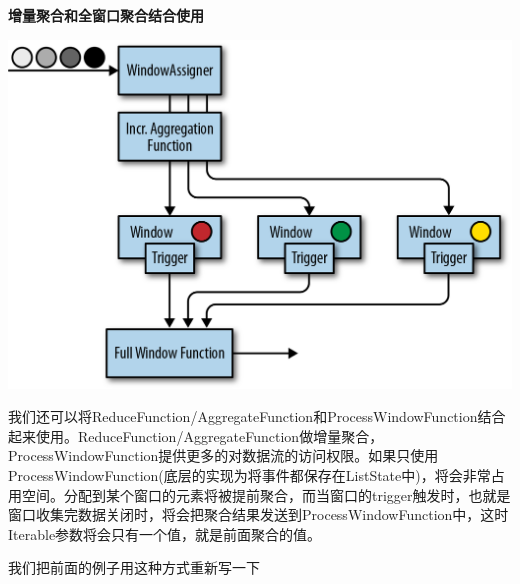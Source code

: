 \documentclass[cn,11pt,chinese]{elegantbook}
\begin{document}
\textbf{增量聚合和全窗口聚合结合使用}

\includegraphics{images/spaf_0606.png}

我们还可以将ReduceFunction/AggregateFunction和ProcessWindowFunction结合起来使用。ReduceFunction/AggregateFunction做增量聚合，ProcessWindowFunction提供更多的对数据流的访问权限。如果只使用ProcessWindowFunction(底层的实现为将事件都保存在ListState中)，将会非常占用空间。分配到某个窗口的元素将被提前聚合，而当窗口的trigger触发时，也就是窗口收集完数据关闭时，将会把聚合结果发送到ProcessWindowFunction中，这时Iterable参数将会只有一个值，就是前面聚合的值。

我们把前面的例子用这种方式重新写一下
\end{document}

